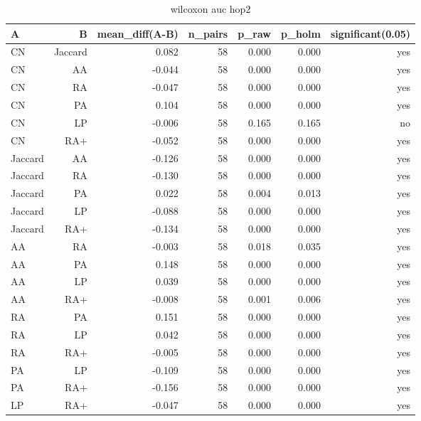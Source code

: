 \begin{table}[t]
\centering
\caption{wilcoxon auc hop2}
\label{tab:wilcoxon_auc_hop2}
\begin{tabular}{lrrrrrr}
\hline
A & B & mean\_diff(A-B) & n\_pairs & p\_raw & p\_holm & significant(0.05) \\
\hline
CN & Jaccard & 0.082 & 58 & 0.000 & 0.000 & yes \\
CN & AA & -0.044 & 58 & 0.000 & 0.000 & yes \\
CN & RA & -0.047 & 58 & 0.000 & 0.000 & yes \\
CN & PA & 0.104 & 58 & 0.000 & 0.000 & yes \\
CN & LP & -0.006 & 58 & 0.165 & 0.165 & no \\
CN & RA+ & -0.052 & 58 & 0.000 & 0.000 & yes \\
Jaccard & AA & -0.126 & 58 & 0.000 & 0.000 & yes \\
Jaccard & RA & -0.130 & 58 & 0.000 & 0.000 & yes \\
Jaccard & PA & 0.022 & 58 & 0.004 & 0.013 & yes \\
Jaccard & LP & -0.088 & 58 & 0.000 & 0.000 & yes \\
Jaccard & RA+ & -0.134 & 58 & 0.000 & 0.000 & yes \\
AA & RA & -0.003 & 58 & 0.018 & 0.035 & yes \\
AA & PA & 0.148 & 58 & 0.000 & 0.000 & yes \\
AA & LP & 0.039 & 58 & 0.000 & 0.000 & yes \\
AA & RA+ & -0.008 & 58 & 0.001 & 0.006 & yes \\
RA & PA & 0.151 & 58 & 0.000 & 0.000 & yes \\
RA & LP & 0.042 & 58 & 0.000 & 0.000 & yes \\
RA & RA+ & -0.005 & 58 & 0.000 & 0.000 & yes \\
PA & LP & -0.109 & 58 & 0.000 & 0.000 & yes \\
PA & RA+ & -0.156 & 58 & 0.000 & 0.000 & yes \\
LP & RA+ & -0.047 & 58 & 0.000 & 0.000 & yes \\
\hline
\end{tabular}
\end{table}